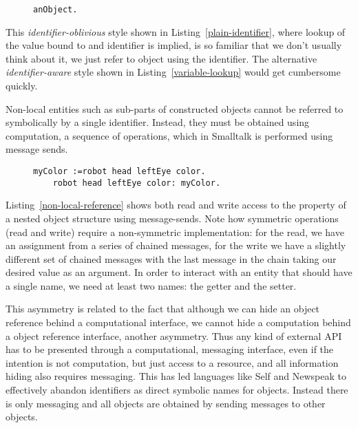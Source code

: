 \documentclass[preprint,authoryear]{acm_proc_article-sp}
\begin{document}
\begin{figure}[htbp]
\begin{lstlisting}[style=L,label=plain-identifier,caption=Identifier-oblivious variable lookup.]
  anObject.
\end{lstlisting}
\end{figure}

This  {\em identifier-oblivious} style shown in Listing~\ref{plain-identifier}, where lookup of the value bound to and
identifier is implied, is so familiar that we don't usually think about it, we just
refer to object using the identifier.
The alternative {\em identifier-aware} style shown in Listing~\ref{variable-lookup} would get cumbersome quickly.

Non-local entities such as sub-parts of constructed objects 
cannot be referred to symbolically by a single identifier.
Instead, they must be obtained using computation, a 
sequence of operations, which in Smalltalk is performed using message sends.



\begin{figure}[htbp]
\begin{lstlisting}[style=L,label=non-local-reference,caption=Accessing objects via chained message sends.]
	myColor :=robot head leftEye color.
	robot head leftEye color: myColor.
\end{lstlisting}
\end{figure}

Listing~\ref{non-local-reference} shows both read and write access to the property
of a nested object structure using message-sends.  Note how symmetric operations
(read and write) require a non-symmetric implementation:  for the read, we have an assignment
from a series of chained messages, for the write we have a slightly different set of 
chained messages with the last message in the chain taking our desired value
as an argument.  In order to interact with an entity that should have a single name,
we need at least two names:  the getter and the setter.

This asymmetry is related to the fact that although we can hide an object reference 
behind a computational interface, we cannot
hide a computation behind a object reference interface, another asymmetry.
Thus any kind of external API has to be presented through a computational, messaging 
interface, even if the intention is not computation, but just access to a resource,
  and all information hiding also requires messaging.  This has led languages
like Self \cite{UngarS87} and Newspeak \cite{newspeak} to effectively abandon identifiers as direct symbolic names for objects. Instead there is only messaging and
all objects are obtained by sending messages to other objects.
\end{document}
